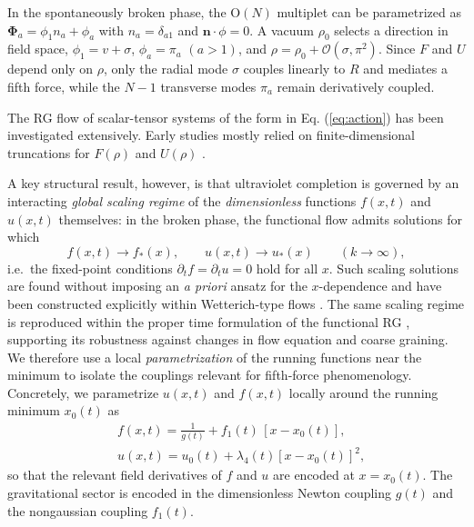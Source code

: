 \documentclass[reprint,superscriptaddress,amsmath,amssymb,aps,prl,floatfix]{revtex4-2}
\begin{document}
In the spontaneously broken phase, the O$(N)$ multiplet can be parametrized as $\mathbf{\Phi}_a=\phi_1 n_a+\phi_a$ with $n_a=\delta_{a1}$ and $\mathbf{n}\cdot\phi=0$. A vacuum $\rho_0$ selects a direction in field space, $\phi_1 = v + \sigma$, $\phi_a = \pi_a$ $(a>1)$, and $\rho = \rho_0 + \mathcal{O}(\sigma,\pi^2)$. Since $F$ and $U$ depend only on $\rho$, only the radial mode $\sigma$ couples linearly to $R$ and mediates a fifth force,
while the $N-1$ transverse modes $\pi_a$ remain derivatively coupled.

The RG flow of scalar-tensor systems of the form in Eq.  (\ref{eq:action}) has been investigated extensively. Early studies mostly relied on finite-dimensional truncations for $F(\rho)$ and $U(\rho)$ \cite{Percacci:2003jz,Narain:2009fy,Narain:2009gb,Merzlikin:2017zan}.

A key structural result, however, is that ultraviolet completion is governed by an interacting \emph{global scaling regime} of the \emph{dimensionless} functions $f(x,t)$ and $u(x,t)$ themselves:
in the broken phase, the functional flow admits solutions for which
\begin{equation}
f(x,t)\to f_\ast(x),\qquad u(x,t)\to u_\ast(x)\qquad (k\to\infty),
\end{equation}
i.e.\ the fixed-point conditions $\partial_t f=\partial_t u=0$ hold for all $x$. Such scaling solutions are found without imposing an \emph{a priori} ansatz for the $x$-dependence and have been constructed explicitly within Wetterich-type flows \cite{Percacci:2015wwa,Labus:2015ska}. The same scaling regime is reproduced within the proper time formulation of the functional RG \cite{Bonanno:2019ukb,bonanno2025propertimefunctionalrenormalizationon}, supporting its robustness against changes in flow equation and coarse graining.  We therefore use a local \emph{parametrization} of the running functions near the minimum to isolate the couplings relevant for fifth-force phenomenology.  Concretely, we parametrize $u(x,t)$ and $f(x,t)$ locally around the running minimum $x_0(t)$ as
\begin{equation}\begin{split}
&f(x,t) = \frac{1}{g(t)} + f_1(t)\,[x-x_0(t)],\\
&u(x,t) = u_0(t) + \lambda_4(t)[x-x_0(t)]^2,
\label{eq:truncation}
\end{split}\end{equation}
so that the relevant field derivatives of $f$ and $u$ are encoded at $x=x_0(t)$. The gravitational sector is encoded in the dimensionless Newton coupling $g(t)$ and the nongaussian coupling $f_1(t)$.
\end{document}
